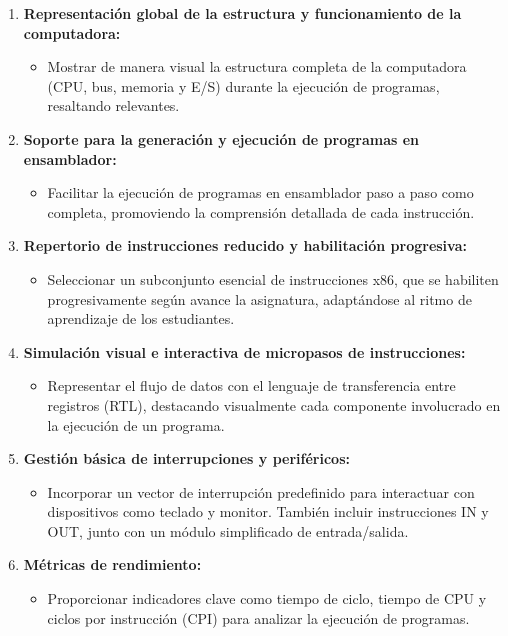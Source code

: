 \documentclass[12pt,oneside]{templates/unerthesis}
\providecommand{\tightlist}{%
  \setlength{\itemsep}{0pt}\setlength{\parskip}{0pt}}
\begin{document}
\begin{enumerate}
\def\labelenumi{\arabic{enumi}.}
\tightlist
\item
  \textbf{Representación global de la estructura y funcionamiento de la computadora:}

  \begin{itemize}
  \tightlist
  \item
    Mostrar de manera visual la estructura completa de la computadora (CPU, bus, memoria y E/S) durante la ejecución de programas, resaltando relevantes.
  \end{itemize}
\item
  \textbf{Soporte para la generación y ejecución de programas en ensamblador:}

  \begin{itemize}
  \tightlist
  \item
    Facilitar la ejecución de programas en ensamblador paso a paso como completa, promoviendo la comprensión detallada de cada instrucción.
  \end{itemize}
\item
  \textbf{Repertorio de instrucciones reducido y habilitación progresiva:}

  \begin{itemize}
  \tightlist
  \item
    Seleccionar un subconjunto esencial de instrucciones x86, que se habiliten progresivamente según avance la asignatura, adaptándose al ritmo de aprendizaje de los estudiantes.
  \end{itemize}
\item
  \textbf{Simulación visual e interactiva de micropasos de instrucciones:}

  \begin{itemize}
  \tightlist
  \item
    Representar el flujo de datos con el lenguaje de transferencia entre registros (RTL), destacando visualmente cada componente involucrado en la ejecución de un programa.
  \end{itemize}
\item
  \textbf{Gestión básica de interrupciones y periféricos:}

  \begin{itemize}
  \tightlist
  \item
    Incorporar un vector de interrupción predefinido para interactuar con dispositivos como teclado y monitor. También incluir instrucciones IN y OUT, junto con un módulo simplificado de entrada/salida.
  \end{itemize}
\item
  \textbf{Métricas de rendimiento:}

  \begin{itemize}
  \tightlist
  \item
    Proporcionar indicadores clave como tiempo de ciclo, tiempo de CPU y ciclos por instrucción (CPI) para analizar la ejecución de programas.
  \end{itemize}
\end{enumerate}
\end{document}
